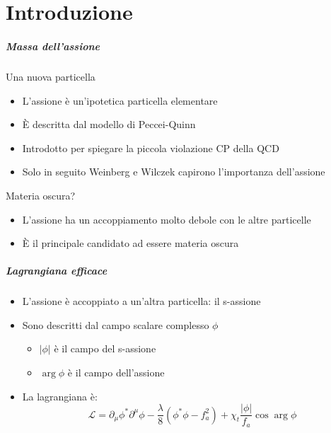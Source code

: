\part{Introduzione}
\makepart

\begin{frame}
    \frametitle{Massa dell'assione}
    {\color{fzjblue} Una nuova particella}
    \begin{itemize}
        \item L'assione è un'ipotetica particella elementare
        \item È descritta dal modello di Peccei-Quinn
        \item Introdotto per spiegare la piccola violazione CP della QCD
        \item Solo in seguito Weinberg e Wilczek capirono l'importanza dell'assione
    \end{itemize}
    {\color{fzjblue} Materia oscura?}
    \begin{itemize}
        \item L'assione ha un accoppiamento molto debole con le altre particelle
        \item È il principale candidato ad essere materia oscura
    \end{itemize}
\end{frame}

\begin{frame}
    \frametitle{Lagrangiana efficace}
    \begin{itemize}
        \item L'assione è accoppiato a un'altra particella: il s-assione
        \item Sono descritti dal campo scalare complesso $\phi$
            \begin{itemize}
                \item $\left|\phi\right|$ è il campo del s-assione
                \item $\arg\phi$ è il campo dell'assione
            \end{itemize}
        \item La lagrangiana è:
        $$\mathcal{L} = \partial_\mu\phi^*\partial^\mu\phi%
                      - \frac{\lambda}{8}\left(\phi^*\phi-f_a^2\right)%
                      + \chi_t\frac{\left|\phi\right|}{f_a}\cos\arg\phi$$
    \end{itemize}
\end{frame}

